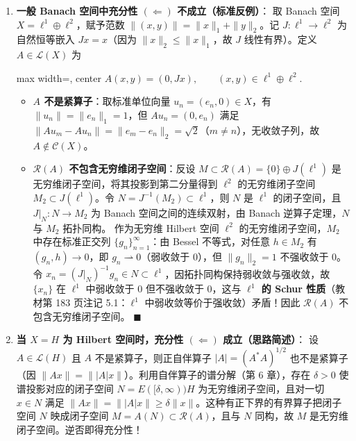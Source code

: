 \documentclass[11pt,a4paper]{article}
\providecommand{\tightlist}{\setlength{\itemsep}{1.8pt}\setlength{\parskip}{0pt}}
\newcommand{\FitDisplayMath}[1]{%
  \par\vspace{4pt}\noindent
  \begin{adjustbox}{max width=\linewidth, center}
    $\displaystyle #1$
  \end{adjustbox}
  \par\vspace{4pt}%
}
\begin{document}
\begin{enumerate}
\def\labelenumi{\arabic{enumi}.}
\tightlist
\item
  \textbf{一般 Banach 空间中充分性 \((\Leftarrow)\) 不成立（标准反例）}： 取 Banach 空间 \(X = \ell^1 \oplus \ell^2\)，赋予范数 \(\|(x, y)\| = \|x\|_1 + \|y\|_2\)。记 \(J: \ell^1 \to \ell^2\) 为自然恒等嵌入 \(Jx = x\)（因为 \(\|x\|_2 \le \|x\|_1\)，故 \(J\) 线性有界）。定义 \(A \in \mathcal{L}(X)\) 为 
\FitDisplayMath{A(x, y) = (0, Jx), \qquad (x, y) \in \ell^1 \oplus \ell^2.}


  \begin{itemize}
  \tightlist
  \item
    \textbf{\(A\) 不是紧算子}：取标准单位向量 \(u_n = (e_n, 0) \in X\)，有 \(\|u_n\| = \|e_n\|_1 = 1\)，但 \(Au_n = (0, e_n)\) 满足 \(\|Au_m - Au_n\| = \|e_m - e_n\|_2 = \sqrt{2}\)（\(m \neq n\)），无收敛子列，故 \(A \notin \mathcal{C}(X)\)。
  \item
    \textbf{\(\mathcal{R}(A)\) 不包含无穷维闭子空间}：反设 \(M \subset \mathcal{R}(A) = \{0\} \oplus J(\ell^1)\) 是无穷维闭子空间，将其投影到第二分量得到 \(\ell^2\) 的无穷维闭子空间 \(M_2 \subset J(\ell^1)\)。令 \(N = J^{-1}(M_2) \subset \ell^1\)，则 \(N\) 是 \(\ell^1\) 的闭子空间，且 \(J|_N: N \to M_2\) 为 Banach 空间之间的连续双射，由 Banach 逆算子定理，\(N\) 与 \(M_2\) 拓扑同构。 作为无穷维 Hilbert 空间 \(\ell^2\) 的无穷维闭子空间，\(M_2\) 中存在标准正交列 \(\{g_n\}_{n=1}^\infty\)：由 Bessel 不等式，对任意 \(h \in M_2\) 有 \((g_n, h) \to 0\)，即 \(g_n \rightharpoonup 0\)（弱收敛于 \(0\)），但 \(\|g_n\|_2 = 1\) 不强收敛于 \(0\)。令 \(x_n = (J|_N)^{-1} g_n \in N \subset \ell^1\)，因拓扑同构保持弱收敛与强收敛，故 \(\{x_n\}\) 在 \(\ell^1\) 中弱收敛于 \(0\) 但不强收敛于 \(0\)，这与 \textbf{\(\ell^1\) 的 Schur 性质}（教材第 183 页注记 5.1：\(\ell^1\) 中弱收敛等价于强收敛）矛盾！因此 \(\mathcal{R}(A)\) 不包含无穷维闭子空间。 \(\blacksquare\)
  \end{itemize}
\item
  \textbf{当 \(X = H\) 为 Hilbert 空间时，充分性 \((\Leftarrow)\) 成立（思路简述）}： 设 \(A \in \mathcal{L}(H)\) 且 \(A\) 不是紧算子，则正自伴算子 \(|A| = (A^*A)^{1/2}\) 也不是紧算子（因 \(\|Ax\| = \||A|x\|\)）。利用自伴算子的谱分解（第 6 章），存在 \(\delta > 0\) 使谱投影对应的闭子空间 \(N = E([\delta, \infty))H\) 为无穷维闭子空间，且对一切 \(x \in N\) 满足 \(\|Ax\| = \||A|x\| \ge \delta \|x\|\)。这种有正下界的有界算子把闭子空间 \(N\) 映成闭子空间 \(M = A(N) \subset \mathcal{R}(A)\)，且与 \(N\) 同构，故 \(M\) 是无穷维闭子空间。逆否即得充分性！
\end{enumerate}
\end{document}
